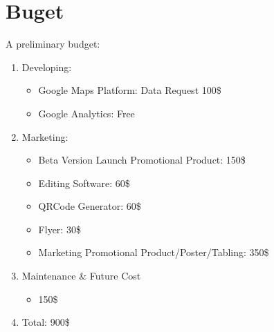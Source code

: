 \documentclass[letterpaper,12pt]{article}
\begin{document}
\section{Buget}
A preliminary budget: 
\begin{enumerate}
    \item Developing:
    \begin{itemize}
        \item Google Maps Platform: Data Request 100\$
        \item Google Analytics: Free
    \end{itemize}
    \item Marketing:
    \begin{itemize}
        \item Beta Version Launch Promotional Product: 150\$
        \item Editing Software: 60\$
        \item QRCode Generator: 60\$
        \item Flyer: 30\$
        \item Marketing Promotional Product/Poster/Tabling: 350\$
    \end{itemize}
    \item Maintenance \& Future Cost
    \begin{itemize}
        \item 150\$
    \end{itemize}
    \item  Total: 900\$

\end{enumerate}
\end{document}
